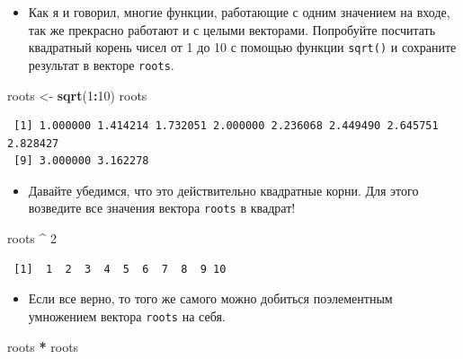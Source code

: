 \documentclass[
]{book}
\newenvironment{Shaded}{\begin{snugshade}}{\end{snugshade}}
\newcommand{\DecValTok}[1]{\textcolor[rgb]{0.00,0.00,0.81}{#1}}
\newcommand{\KeywordTok}[1]{\textcolor[rgb]{0.13,0.29,0.53}{\textbf{#1}}}
\newcommand{\NormalTok}[1]{#1}
\newcommand{\OperatorTok}[1]{\textcolor[rgb]{0.81,0.36,0.00}{\textbf{#1}}}
\newcommand{\StringTok}[1]{\textcolor[rgb]{0.31,0.60,0.02}{#1}}
\providecommand{\tightlist}{%
  \setlength{\itemsep}{0pt}\setlength{\parskip}{0pt}}
\begin{document}
\begin{itemize}
\tightlist
\item
  Как я и говорил, многие функции, работающие с одним значением на входе, так же прекрасно работают и с целыми векторами. Попробуйте посчитать квадратный корень чисел от 1 до 10 с помощью функции \texttt{sqrt()} и сохраните результат в векторе \texttt{roots}.
\end{itemize}

\begin{Shaded}
\begin{Highlighting}[]
\NormalTok{roots <-}\StringTok{ }\KeywordTok{sqrt}\NormalTok{(}\DecValTok{1}\OperatorTok{:}\DecValTok{10}\NormalTok{)}
\NormalTok{roots}
\end{Highlighting}
\end{Shaded}

\begin{verbatim}
 [1] 1.000000 1.414214 1.732051 2.000000 2.236068 2.449490 2.645751 2.828427
 [9] 3.000000 3.162278
\end{verbatim}

\begin{itemize}
\tightlist
\item
  Давайте убедимся, что это действительно квадратные корни. Для этого возведите все значения вектора \texttt{roots} в квадрат!
\end{itemize}

\begin{Shaded}
\begin{Highlighting}[]
\NormalTok{roots }\OperatorTok{^}\StringTok{ }\DecValTok{2}
\end{Highlighting}
\end{Shaded}

\begin{verbatim}
 [1]  1  2  3  4  5  6  7  8  9 10
\end{verbatim}

\begin{itemize}
\tightlist
\item
  Если все верно, то того же самого можно добиться поэлементным умножением вектора \texttt{roots} на себя.
\end{itemize}

\begin{Shaded}
\begin{Highlighting}[]
\NormalTok{roots }\OperatorTok{*}\StringTok{ }\NormalTok{roots}
\end{Highlighting}
\end{Shaded}
\end{document}
